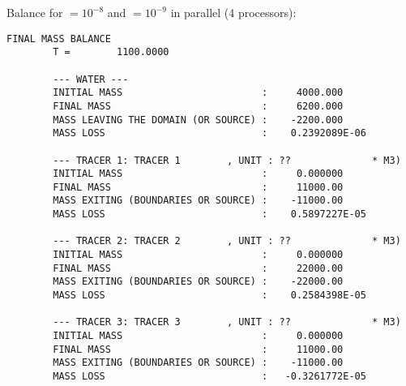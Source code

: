 Balance for  $= 10^{-8}$ and
 $= 10^{-9}$ in parallel
(4 processors):
%
\begin{lstlisting}[language=TelFortran]
                        FINAL MASS BALANCE
        T =        1100.0000

        --- WATER ---
        INITIAL MASS                        :     4000.000
        FINAL MASS                          :     6200.000
        MASS LEAVING THE DOMAIN (OR SOURCE) :    -2200.000
        MASS LOSS                           :    0.2392089E-06

        --- TRACER 1: TRACER 1        , UNIT : ??              * M3)
        INITIAL MASS                        :     0.000000
        FINAL MASS                          :     11000.00
        MASS EXITING (BOUNDARIES OR SOURCE) :    -11000.00
        MASS LOSS                           :    0.5897227E-05

        --- TRACER 2: TRACER 2        , UNIT : ??              * M3)
        INITIAL MASS                        :     0.000000
        FINAL MASS                          :     22000.00
        MASS EXITING (BOUNDARIES OR SOURCE) :    -22000.00
        MASS LOSS                           :    0.2584398E-05

        --- TRACER 3: TRACER 3        , UNIT : ??              * M3)
        INITIAL MASS                        :     0.000000
        FINAL MASS                          :     11000.00
        MASS EXITING (BOUNDARIES OR SOURCE) :    -11000.00
        MASS LOSS                           :   -0.3261772E-05
\end{lstlisting}

